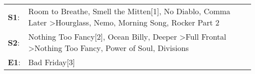 \begin{supertabular}{p{0.03\textwidth}p{0.92\textwidth}}
 \textbf{S1}:  &  Room to Breathe\textsuperscript{}, \enspace Smell the Mitten[1]\textsuperscript{}, \enspace No Diablo\textsuperscript{}, \enspace Comma Later\textsuperscript{} \textgreater \enspace Hourglass\textsuperscript{}, \enspace Nemo\textsuperscript{}, \enspace Morning Song\textsuperscript{}, \enspace Rocker Part 2\textsuperscript{}  \enspace  \\
 \textbf{S2}:  &                       Nothing Too Fancy[2]\textsuperscript{}, \enspace Ocean Billy\textsuperscript{}, \enspace Deeper\textsuperscript{} \textgreater \enspace Full Frontal\textsuperscript{} \textgreater \enspace Nothing Too Fancy\textsuperscript{}, \enspace Power of Soul\textsuperscript{}, \enspace Divisions\textsuperscript{}  \enspace  \\
 \textbf{E1}:  &                                                                                                                                                                                                                                                                                                        Bad Friday[3]\textsuperscript{}  \enspace  \\
\end{supertabular}
